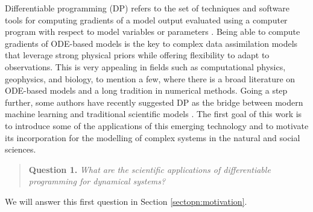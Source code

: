 Differentiable programming (DP) refers to the set of techniques and software tools for computing gradients of a model output evaluated using a computer program with respect to model variables or parameters \cite{Shen_diff_modelling, Innes_Zygote, blondel2024elements}. 
Being able to compute gradients of ODE-based models is the key to complex data assimilation models that leverage strong physical priors while offering flexibility to adapt to observations.
This is very appealing in fields such as computational physics, geophysics, and biology, to mention a few, where there is a broad literature on ODE-based models and a long tradition in numerical methods. 
Going a step further, some authors have recently suggested DP as the bridge between modern machine learning and traditional scientific models \cite{Ramsundar_Krishnamurthy_Viswanathan_2021, Shen_diff_modelling, Gelbrecht-differential-programming-Earth, rackauckas2021generalized}. 
The first goal of this work is to introduce some of the applications of this emerging technology and to motivate its incorporation for the modelling of complex systems in the natural and social sciences. 
\begin{quote}
    \textbf{Question 1. }
    \textit{What are the scientific applications of differentiable programming for dynamical systems?}
\end{quote}
We will answer this first question in Section \ref{sectopn:motivation}. 

